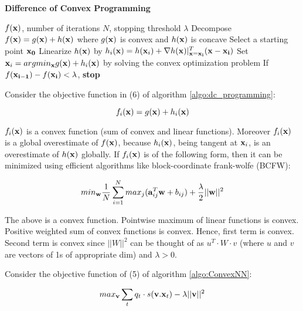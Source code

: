 \documentclass{article}
\begin{document}
\begin{algorithm}
\caption{{\bf Difference of Convex Programming}}\label{algo:dc_programming}
\begin{algorithmic}[1]
 $f({\bf x})$, number of iterations $N$, stopping threshold $\lambda$
\STATE Decompose $f({\bf x}) = g({\bf x}) + h({\bf x})$ where $g({\bf x})$ is convex and $h({\bf x})$ is concave
\STATE Select a starting point $\bf x_0$ 
\STATE Linearize $h({\bf x})$ by $h_i({\bf x})= h({\bf x}_i) + \nabla h({\bf x})|_{\bf x = x_i}^T ({\bf x} - {\bf x_i})$
\STATE Set ${\bf x}_i = argmin_{{\bf x}} g({\bf x}) + h_i({\bf x})$ by solving the convex optimization problem
\STATE If $f({\bf x_{i - 1}}) - f({\bf x_i}) < \lambda$, {\bf stop}
\ENDFOR
\end{algorithmic}
\end{algorithm}

Consider the objective function in (6) of algorithm \ref{algo:dc_programming}:

\begin{equation}
f_i({\bf x}) = g({\bf x}) + h_i({\bf x})
\end{equation}

$f_i({\bf x})$ is a convex function (sum of convex and linear functions). Moreover $f_i({\bf x})$ is a global overestimate of $f({\bf x})$, because $h_i({\bf x})$, being tangent at ${\bf x}_i$, is an overestimate of $h({\bf x})$ globally. If $f_i({\bf x})$ is of the following form, then it can be minimized using efficient algorithms like block-coordinate frank-wolfe (BCFW):

\begin{equation}
min_{\bf w} \frac{1}{N} \sum_{i = 1}^{N} max_j ({\bf a}_{ij}^T{\bf w} + b_{ij}) + \frac{\lambda}{2} ||{\bf w}||^2
\end{equation}

The above is a convex function. Pointwise maximum of linear functions is convex. Positive weighted sum of convex functions is convex. Hence, first term is convex. Second term is convex since $||W||^2$ can be thought of as $u^T \cdot W \cdot v$ (where $u$ and $v$ are vectors of 1s of appropriate dim) and $\lambda > 0$.

Consider the objective function of (5) of algorithm \ref{algo:ConvexNN}:

\begin{equation}
max_{{\bf v}} \sum_{t} q_t \cdot s({\bf v}.{\bf x}_t) - \lambda ||{\bf v}||^2
\end{equation}
\end{document}
